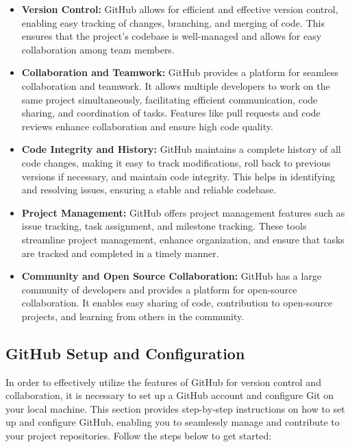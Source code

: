 \begin{itemize}
\item \textbf{Version Control:} GitHub allows for efficient and effective version control, enabling easy tracking of changes, branching, and merging of code. This ensures that the project's codebase is well-managed and allows for easy collaboration among team members.

\item \textbf{Collaboration and Teamwork:} GitHub provides a platform for seamless collaboration and teamwork. It allows multiple developers to work on the same project simultaneously, facilitating efficient communication, code sharing, and coordination of tasks. Features like pull requests and code reviews enhance collaboration and ensure high code quality.

\item \textbf{Code Integrity and History:} GitHub maintains a complete history of all code changes, making it easy to track modifications, roll back to previous versions if necessary, and maintain code integrity. This helps in identifying and resolving issues, ensuring a stable and reliable codebase.

\item \textbf{Project Management:} GitHub offers project management features such as issue tracking, task assignment, and milestone tracking. These tools streamline project management, enhance organization, and ensure that tasks are tracked and completed in a timely manner.

\item \textbf{Community and Open Source Collaboration:} GitHub has a large community of developers and provides a platform for open-source collaboration. It enables easy sharing of code, contribution to open-source projects, and learning from others in the community.
\end{itemize}
\subsection{GitHub Setup and Configuration}

In order to effectively utilize the features of GitHub for version control and collaboration, it is necessary to set up a GitHub account and configure Git on your local machine. This section provides step-by-step instructions on how to set up and configure GitHub, enabling you to seamlessly manage and contribute to your project repositories. Follow the steps below to get started:


